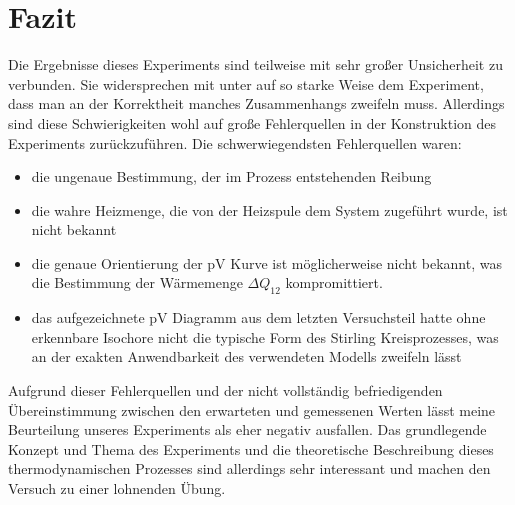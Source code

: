 \documentclass[a4paper, 12pt,]{scrartcl}
\begin{document}
\section{Fazit}
Die Ergebnisse dieses Experiments sind teilweise mit sehr großer Unsicherheit zu verbunden. Sie widersprechen mit unter auf so starke Weise dem Experiment, dass man an der Korrektheit manches Zusammenhangs zweifeln muss. Allerdings sind diese Schwierigkeiten wohl auf große Fehlerquellen in der Konstruktion des Experiments zurückzuführen. Die schwerwiegendsten Fehlerquellen waren:
\begin{itemize}
\item{}die ungenaue Bestimmung, der im Prozess entstehenden Reibung
\item{}die wahre Heizmenge, die von der Heizspule dem System zugeführt wurde, ist nicht bekannt
\item{}die genaue Orientierung der pV Kurve ist möglicherweise nicht bekannt, was die Bestimmung der Wärmemenge $\Delta{Q}_{12}$ kompromittiert.
\item{}das aufgezeichnete pV Diagramm aus dem letzten Versuchsteil hatte ohne erkennbare Isochore nicht die typische Form des Stirling Kreisprozesses, was an der exakten Anwendbarkeit des verwendeten Modells zweifeln lässt
\end{itemize}
Aufgrund dieser Fehlerquellen und der nicht vollständig befriedigenden Übereinstimmung zwischen den erwarteten und gemessenen Werten lässt meine Beurteilung unseres Experiments als eher negativ ausfallen. Das grundlegende Konzept und Thema des Experiments und die theoretische Beschreibung dieses thermodynamischen Prozesses sind allerdings sehr interessant und machen den Versuch zu einer lohnenden Übung.


\end{document}

